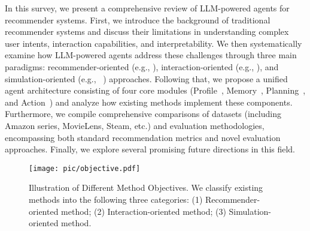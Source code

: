 In this survey, we present a comprehensive review of LLM-powered agents for recommender systems. 
First, we introduce the background of traditional recommender systems and discuss their limitations in understanding complex user intents, interaction capabilities, and interpretability. 
We then systematically examine how LLM-powered agents address these challenges through three main paradigms: recommender-oriented (e.g., \cite{wang2024recmind,wang2024macrec}), interaction-oriented (e.g., \cite{zeng2024automated,friedman2023leveraging}), and simulation-oriented (e.g., ~\cite{yoon2024evaluating,guo2024knowledge}) approaches. 
Following that, we propose a unified agent architecture consisting of four core modules (Profile~\cite{cai2024flow,zhang2024agentcf}, Memory~\cite{shi2024large,fang2024multi}, Planning~\cite{wang2023drdt,shi2024large}, and Action~\cite{cshi,toolrec}) and analyze how existing methods implement these components. 
Furthermore, we compile comprehensive comparisons of datasets (including Amazon series, MovieLens, Steam, etc.) and evaluation methodologies, encompassing both standard recommendation metrics and novel evaluation approaches. 
Finally, we explore several promising future directions in this field.

\begin{figure*}
    \centering
    \texttt{[image: pic/objective.pdf]}
    \caption{Illustration of Different Method Objectives. We classify existing methods into the following three categories: (1) Recommender-oriented method; (2) Interaction-oriented method; (3) Simulation-oriented method.}
    \label{objective}
\end{figure*}

